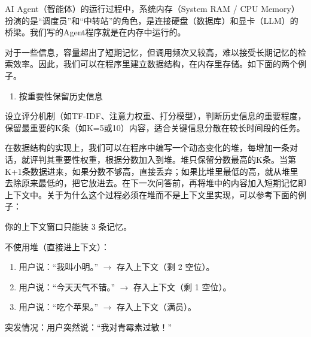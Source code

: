 AI Agent（智能体）的运行过程中，系统内存（System RAM / CPU Memory）扮演的是``调度员''和``中转站''的角色，是连接硬盘（数据库）和显卡（LLM）的桥梁。我们写的Agent程序就是在内存中运行的。

对于一些信息，容量超出了短期记忆，但调用频次又较高，难以接受长期记忆的检索效率。因此，我们可以在程序里建立数据结构，在内存里存储。如下面的两个例子。

\begin{enumerate}
\def\labelenumi{\arabic{enumi}.}
\tightlist
\item
  按重要性保留历史信息
\end{enumerate}

设立评分机制（如TF-IDF、注意力权重、打分模型），判断历史信息的重要程度，保留最重要的K条（如K=5或10）内容，适合关键信息分散在较长时间段的任务。

在数据结构的实现上，我们可以在程序中编写一个动态变化的堆，每增加一条对话，就评判其重要性权重，根据分数加入到堆。堆只保留分数最高的K条。当第K+1条数据进来，如果分数不够高，直接丢弃；如果比堆里最低的高，就从堆里去除原来最低的，把它放进去。在下一次问答前，再将堆中的内容加入短期记忆即上下文中。关于为什么这个过程必须在堆而不是上下文里实现，可以参考下面的例子：

你的上下文窗口只能装 3 条记忆。

不使用堆（直接进上下文）：

\begin{enumerate}
\def\labelenumi{\arabic{enumi}.}
\tightlist
\item
  用户说：``我叫小明。'' \(\to\) 存入上下文（剩 2 空位）。
\item
  用户说：``今天天气不错。'' \(\to\) 存入上下文（剩 1 空位）。
\item
  用户说：``吃个苹果。'' \(\to\) 存入上下文（满员）。
\end{enumerate}

突发情况：用户突然说：``我对青霉素过敏！''

